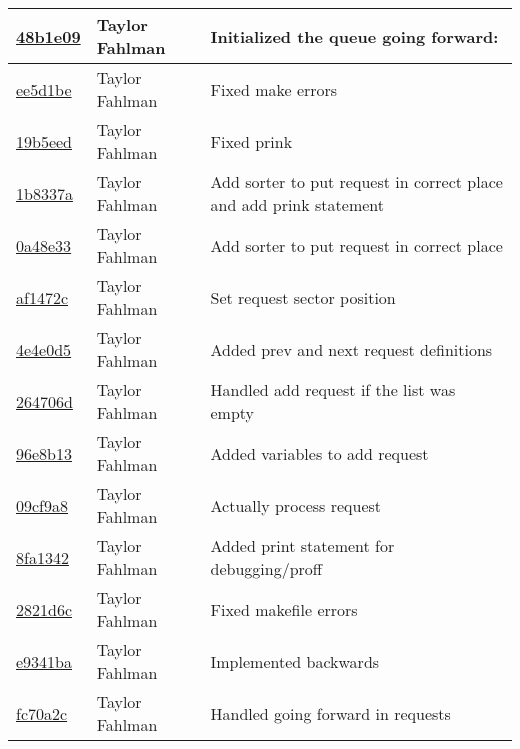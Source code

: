 \begin{tabular}{l l l}
\href{git@github.com:fahlmant/cs444/commit/48b1e091f6f8445fc355268ded9d2ab085f38217}{48b1e09} & Taylor Fahlman & Initialized the queue going forward:\\\hline
\href{git@github.com:fahlmant/cs444/commit/ee5d1be765a4359e795c1cfab79f45e7157dc427}{ee5d1be} & Taylor Fahlman & Fixed make errors\\\hline
\href{git@github.com:fahlmant/cs444/commit/19b5eed5fce8f0988d6de8e32433e71ec722f401}{19b5eed} & Taylor Fahlman & Fixed prink\\\hline
\href{git@github.com:fahlmant/cs444/commit/1b8337adbfd556c19331c13e47fdf30f6be4aa2c}{1b8337a} & Taylor Fahlman & Add sorter to put request in correct place and add prink statement\\\hline
\href{git@github.com:fahlmant/cs444/commit/0a48e33e7e336bcfa08225cb01f3df0fcaaed1f8}{0a48e33} & Taylor Fahlman & Add sorter to put request in correct place\\\hline
\href{git@github.com:fahlmant/cs444/commit/af1472c36acd59ba67588633806bf0893cfe8b8b}{af1472c} & Taylor Fahlman & Set request sector position\\\hline
\href{git@github.com:fahlmant/cs444/commit/4e4e0d50bb79cb0287dd9e15bf858950aca4e52c}{4e4e0d5} & Taylor Fahlman & Added prev and next request definitions\\\hline
\href{git@github.com:fahlmant/cs444/commit/264706d970dd72869b019450b1f75bc089303f51}{264706d} & Taylor Fahlman & Handled add request if the list was empty\\\hline
\href{git@github.com:fahlmant/cs444/commit/96e8b1364367fb70321afbf63863220dec0966bb}{96e8b13} & Taylor Fahlman & Added variables to add request\\\hline
\href{git@github.com:fahlmant/cs444/commit/09cf9a81142f457cc824439568eb4f7d0202b485}{09cf9a8} & Taylor Fahlman & Actually process request\\\hline
\href{git@github.com:fahlmant/cs444/commit/8fa13421d3f213f3e1698235bd37426b314838d6}{8fa1342} & Taylor Fahlman & Added print statement for debugging/proff\\\hline
\href{git@github.com:fahlmant/cs444/commit/2821d6ce67d5d1a5051838079defe48c4f14ee9f}{2821d6c} & Taylor Fahlman & Fixed makefile errors\\\hline
\href{git@github.com:fahlmant/cs444/commit/e9341bad2ae0d815c1eddedcb0070bb99c3ae231}{e9341ba} & Taylor Fahlman & Implemented backwards\\\hline
\href{git@github.com:fahlmant/cs444/commit/fc70a2c72e4933dbf271bf6f5b4adc250cd93f0b}{fc70a2c} & Taylor Fahlman & Handled going forward in requests\\\hline

\end{tabular}
